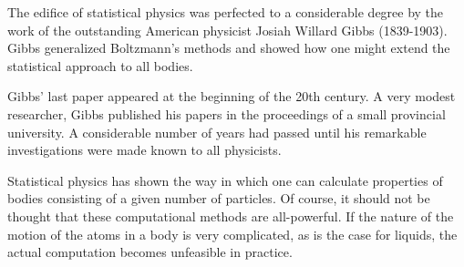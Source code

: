 The edifice of statistical physics was perfected to a considerable degree by the work of the outstanding Amer­ican physicist Josiah Willard Gibbs (1839-1903). Gibbs generalized Boltzmann’s methods and showed how one might extend the statistical approach to all bodies.

Gibbs’ last paper appeared at the beginning of the 20th century. A very modest researcher, Gibbs published his papers in the proceedings of a small provincial uni­versity. A considerable number of years had passed until his remarkable investigations were made known to all physicists.

Statistical physics has shown the way in which one can calculate properties of bodies consisting of a given num­ber of particles. Of course, it should not be thought that these computational methods are all-powerful. If the nature of the motion of the atoms in a body is very complicated, as is the case for liquids, the actual computa­tion becomes unfeasible in practice.